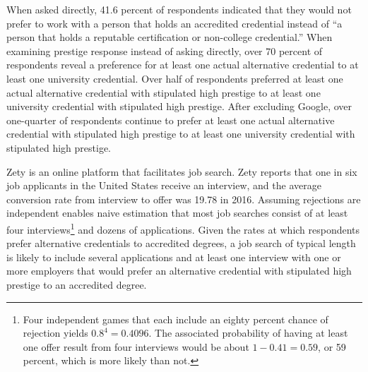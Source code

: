 When asked directly, 41.6 percent of respondents indicated that they would not prefer to
work with a person that holds an accredited credential instead of ``a person that holds a reputable certification or non-college credential.''
When examining prestige response instead of asking directly, over 70 percent of respondents reveal a preference for
at least one actual alternative credential to at least one university credential.
Over half of respondents preferred at least one actual alternative credential with stipulated high prestige
to at least one university credential with stipulated high prestige.
After excluding Google, over one-quarter of respondents continue to prefer
at least one actual alternative credential with stipulated high prestige to at least one university credential with stipulated high prestige.

Zety is an online platform that facilitates job search.
Zety reports that one in six job applicants in the United States receive an interview,
and the average conversion rate from interview to offer was 19.78 in 2016\cite{turczynski_2021}.
Assuming rejections are independent enables naive estimation that most job searches consist of at least four interviews\footnote{
    Four independent games that each include an eighty percent chance of rejection yields $0.8^4 = 0.4096$.
    The associated probability of having at least one offer result from four interviews would be about $1 - 0.41 = 0.59$,
    or 59 percent, which is more likely than not.
} and dozens of applications.
Given the rates at which respondents prefer alternative credentials to accredited degrees,
a job search of typical length is likely to include several applications and at least one interview
with one or more employers that would prefer an alternative credential with stipulated high prestige to an accredited degree.




